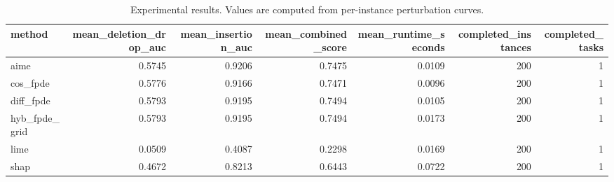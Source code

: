\begin{table}[t]
\caption{Experimental results. Values are computed from per-instance perturbation curves.}
\label{tab:main_results_computed}
\centering
\begin{tabular}{lrrrrrr}
\toprule
method & mean\_deletion\_drop\_auc & mean\_insertion\_auc & mean\_combined\_score & mean\_runtime\_seconds & completed\_instances & completed\_tasks \\
\midrule
aime & 0.5745 & 0.9206 & 0.7475 & 0.0109 & 200 & 1 \\
cos\_fpde & 0.5776 & 0.9166 & 0.7471 & 0.0096 & 200 & 1 \\
diff\_fpde & 0.5793 & 0.9195 & 0.7494 & 0.0105 & 200 & 1 \\
hyb\_fpde\_grid & 0.5793 & 0.9195 & 0.7494 & 0.0173 & 200 & 1 \\
lime & 0.0509 & 0.4087 & 0.2298 & 0.0169 & 200 & 1 \\
shap & 0.4672 & 0.8213 & 0.6443 & 0.0722 & 200 & 1 \\
\bottomrule
\end{tabular}

\end{table}
